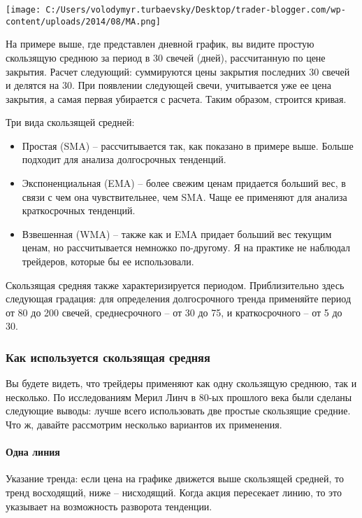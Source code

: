 \documentclass[a5paper]{article}
\begin{document}
\texttt{[image: C:/Users/volodymyr.turbaevsky/Desktop/trader-blogger.com/wp-content/uploads/2014/08/MA.png]}

На примере выше, где представлен дневной график, вы видите простую скользящую среднюю за период в 30 свечей (дней), рассчитанную по цене закрытия. Расчет следующий: суммируются цены закрытия последних 30 свечей и делятся на 30. При появлении следующей свечи, учитывается уже ее цена закрытия, а самая первая убирается с расчета. Таким образом, строится кривая.

Три вида скользящей средней:

\begin{itemize}
\item     Простая (SMA) – рассчитывается так, как показано в примере выше. Больше подходит для анализа долгосрочных тенденций.
\item     Экспоненциальная (EMA) – более свежим ценам придается больший вес, в связи с чем она чувствительнее, чем SMA. Чаще ее применяют для анализа краткосрочных тенденций.
\item     Взвешенная (WMA) – также как и EMA придает больший вес текущим ценам, но рассчитывается немножко по-другому. Я на практике не наблюдал трейдеров, которые бы ее использовали.
\end{itemize}

Скользящая средняя также характеризируется периодом. Приблизительно
здесь следующая градация: для определения долгосрочного тренда
применяйте период от 80 до 200 свечей, среднесрочного – от 30 до 75, и
краткосрочного – от 5 до 30.

\subsubsection{Как используется скользящая средняя}

Вы будете видеть, что трейдеры применяют как одну скользящую среднюю, так и несколько. По исследованиям Мерил Линч в 80-ых прошлого века были сделаны следующие выводы: лучше всего использовать две простые скользящие средние. Что ж, давайте рассмотрим несколько вариантов их применения.

\paragraph{Одна линия}

Указание тренда: если цена на графике движется выше скользящей средней, то тренд восходящий, ниже – нисходящий. Когда акция пересекает линию, то это указывает на возможность разворота тенденции.
\end{document}
